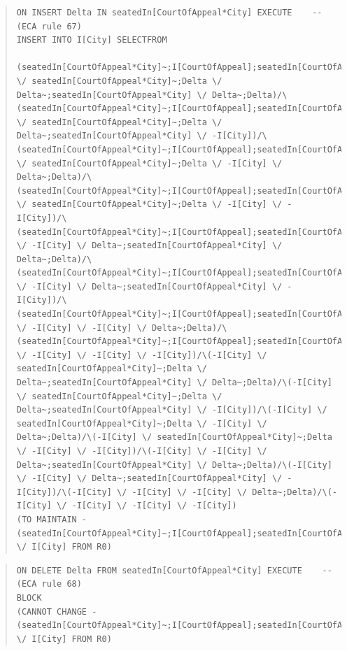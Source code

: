 \documentclass[10pt,a4paper]{report}              %
\theoremstyle{plain}\theorembodyfont{\rmfamily}\newtheorem{definition}{Definition}[section]
\theoremstyle{plain}\theorembodyfont{\rmfamily}\newtheorem{designrule}[definition]{Requirement}
\begin{document}
\begin{quote}
\begin{verbatim}
ON INSERT Delta IN seatedIn[CourtOfAppeal*City] EXECUTE    -- (ECA rule 67)
INSERT INTO I[City] SELECTFROM
  (seatedIn[CourtOfAppeal*City]~;I[CourtOfAppeal];seatedIn[CourtOfAppeal*City] \/ seatedIn[CourtOfAppeal*City]~;Delta \/ Delta~;seatedIn[CourtOfAppeal*City] \/ Delta~;Delta)/\(seatedIn[CourtOfAppeal*City]~;I[CourtOfAppeal];seatedIn[CourtOfAppeal*City] \/ seatedIn[CourtOfAppeal*City]~;Delta \/ Delta~;seatedIn[CourtOfAppeal*City] \/ -I[City])/\(seatedIn[CourtOfAppeal*City]~;I[CourtOfAppeal];seatedIn[CourtOfAppeal*City] \/ seatedIn[CourtOfAppeal*City]~;Delta \/ -I[City] \/ Delta~;Delta)/\(seatedIn[CourtOfAppeal*City]~;I[CourtOfAppeal];seatedIn[CourtOfAppeal*City] \/ seatedIn[CourtOfAppeal*City]~;Delta \/ -I[City] \/ -I[City])/\(seatedIn[CourtOfAppeal*City]~;I[CourtOfAppeal];seatedIn[CourtOfAppeal*City] \/ -I[City] \/ Delta~;seatedIn[CourtOfAppeal*City] \/ Delta~;Delta)/\(seatedIn[CourtOfAppeal*City]~;I[CourtOfAppeal];seatedIn[CourtOfAppeal*City] \/ -I[City] \/ Delta~;seatedIn[CourtOfAppeal*City] \/ -I[City])/\(seatedIn[CourtOfAppeal*City]~;I[CourtOfAppeal];seatedIn[CourtOfAppeal*City] \/ -I[City] \/ -I[City] \/ Delta~;Delta)/\(seatedIn[CourtOfAppeal*City]~;I[CourtOfAppeal];seatedIn[CourtOfAppeal*City] \/ -I[City] \/ -I[City] \/ -I[City])/\(-I[City] \/ seatedIn[CourtOfAppeal*City]~;Delta \/ Delta~;seatedIn[CourtOfAppeal*City] \/ Delta~;Delta)/\(-I[City] \/ seatedIn[CourtOfAppeal*City]~;Delta \/ Delta~;seatedIn[CourtOfAppeal*City] \/ -I[City])/\(-I[City] \/ seatedIn[CourtOfAppeal*City]~;Delta \/ -I[City] \/ Delta~;Delta)/\(-I[City] \/ seatedIn[CourtOfAppeal*City]~;Delta \/ -I[City] \/ -I[City])/\(-I[City] \/ -I[City] \/ Delta~;seatedIn[CourtOfAppeal*City] \/ Delta~;Delta)/\(-I[City] \/ -I[City] \/ Delta~;seatedIn[CourtOfAppeal*City] \/ -I[City])/\(-I[City] \/ -I[City] \/ -I[City] \/ Delta~;Delta)/\(-I[City] \/ -I[City] \/ -I[City] \/ -I[City])
(TO MAINTAIN -(seatedIn[CourtOfAppeal*City]~;I[CourtOfAppeal];seatedIn[CourtOfAppeal*City]) \/ I[City] FROM R0)
\end{verbatim}
\end{quote}
\begin{quote}
\begin{verbatim}
ON DELETE Delta FROM seatedIn[CourtOfAppeal*City] EXECUTE    -- (ECA rule 68)
BLOCK
(CANNOT CHANGE -(seatedIn[CourtOfAppeal*City]~;I[CourtOfAppeal];seatedIn[CourtOfAppeal*City]) \/ I[City] FROM R0)
\end{verbatim}
\end{quote}
\end{document}
